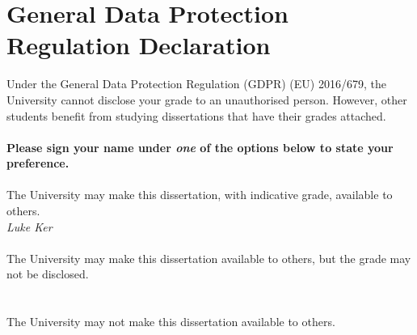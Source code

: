 \section*{General Data Protection Regulation Declaration}
Under the General Data Protection Regulation (GDPR) (EU) 2016/679, the University cannot disclose your grade to an unauthorised person. However, other students benefit from studying dissertations that have their grades attached.
\newline\\
\\
\textbf{Please sign your name under \textit{one} of the options below to state your preference.}
\newline\\
\\
The University may make this dissertation, with indicative grade, available to others.
\\
\newline
\textit{Luke Ker}
\\
\newline
\\
The University may make this dissertation available to others, but the grade may not be disclosed.
\\
\newline
\\
\newline
\\
\newline
The University may not make this dissertation available to others.



